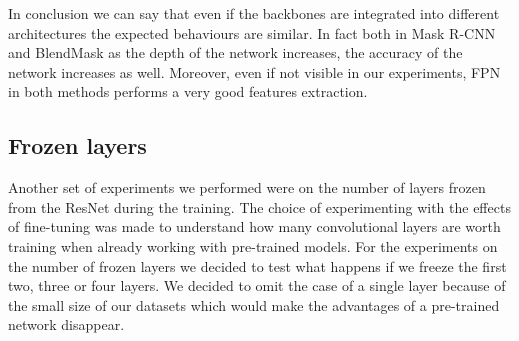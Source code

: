 \documentclass[10pt,twocolumn,letterpaper]{article}
\begin{document}
In conclusion we can say that even if the backbones are integrated into different architectures the expected behaviours are similar. 
In fact both in Mask R-CNN and BlendMask as the depth of the network increases, the accuracy of the network increases as well. 
Moreover, even if not visible in our experiments, FPN in both methods performs a very good features extraction.



\subsection{Frozen layers}
Another set of experiments we performed were on the number of layers frozen from the ResNet during the training. The choice of experimenting with the effects of fine-tuning was made to understand how many convolutional layers are worth training when already working with pre-trained models.
For the experiments on the number of frozen layers we decided to test what happens if we freeze the first two, three or four layers. We decided to omit the case of a single layer because of the small size of our datasets which would make the advantages of a pre-trained network disappear.
\end{document}
